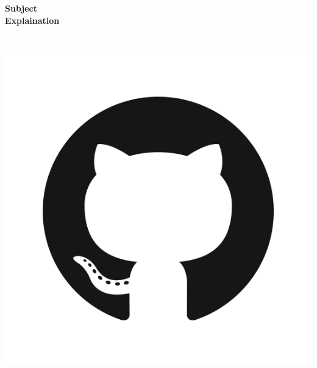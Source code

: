 \begin{titlepage}
	\setcounter{page}{0}
    \begin{center}

    \textsc{\Large }\\[1.5cm]

    \HRule \\[0.4cm]

    {\huge \bfseries Subject\\
    Explaination\\[0.4cm] }

    \HRule \\[2.7cm]

    \begin{minipage}{.4\textwidth}
        \begin{flushleft}
            \includegraphics[width=\textwidth]{./img/GitHub.png}
        \end{flushleft}
    \end{minipage}~~~~~
    \begin{minipage}{.4\textwidth}
        \begin{flushright}

\end{flushright}
\end{minipage}
\end{center}
\end{titlepage}
